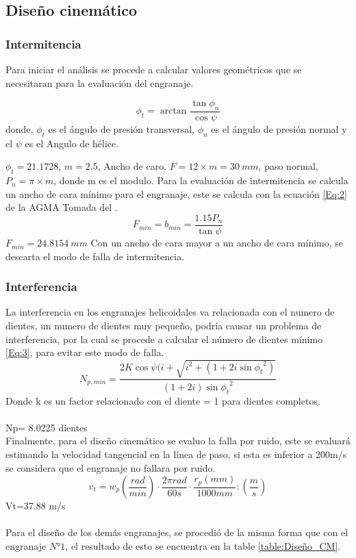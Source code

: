\subsection*{Diseño cinemático}
\subsubsection*{Intermitencia}
Para iniciar el análisis se procede a calcular valores geométricos que se necesitaran para la evaluación del engranaje. 

\begin{equation}
 \phi_{t}=\arctan{\frac{\tan{\phi_{n}}}{\cos{\psi}}}
\label{Eq:1}    
\end{equation}
donde, $ \phi_{t}$  es el ángulo de presión transversal, $\phi_{n}$ es el ángulo de presión normal y el $\psi$ es el Angulo de hélice.

$\phi_t = 21.1728$, $m=2.5$,    Ancho de caro, $F = 12\times m = 30~mm$, paso normal, $P_n=\pi \times m$, donde m es el modulo.
Para la evaluación de intermitencia se calcula un ancho de cara mínimo para el engranaje, este se calcula con la ecuación \ref{Eq:2} de la AGMA Tomada  del \citep{shigley2011shigley}.
\begin{equation}
 F_{min}=b_{min}=\frac{1.15 P_{n}}{\tan{\psi}}
\label{Eq:2}    
\end{equation}
$F_{min}= 24.8154~mm$
Con un ancho de cara mayor a un ancho de cara mínimo, se descarta el modo de falla de intermitencia.
\subsubsection*{Interferencia}
La interferencia en los engranajes helicoidales va relacionada con el numero de dientes, un numero de dientes muy pequeño, podría causar un problema de interferencia, por la cual se procede a calcular el número de dientes mínimo  \ref{Eq:3}, para evitar este modo de falla.
\begin{equation}
 N_{p,min}=\frac{2K \cos{\psi}(i+\sqrt{i^{2}+(1+2i\sin{\phi_{t}}^{2})}}{(1+2i)\sin{\phi_{t}}^{2}}
\label{Eq:3}    
\end{equation}
Donde k es un factor relacionado con el diente = 1 para dientes completos.
\\\\
Np= 8.0225 dientes\\

Finalmente, para el diseño cinemático se evaluo la falla por ruido, este se evaluará estimando la velocidad tangencial en la línea de paso, si esta es inferior a 200m/s se considera que el engranaje no fallara por ruido.
\begin{equation}
 v_{t}=w_{p}(\frac{rad}{min})\cdot\frac{2\pi rad}{60 s}\cdot\frac{r_{p}(mm)}{1000mm}:(\frac{m}{s})
\label{Eq:4}    
\end{equation}
Vt=37.88 m/s\\\\
Para el diseño de los demás engranajes, se procedió de la misma forma que con el engranaje $N° 1$, el resultado de esto se encuentra en la table \ref{table:Diseño_CM}.


